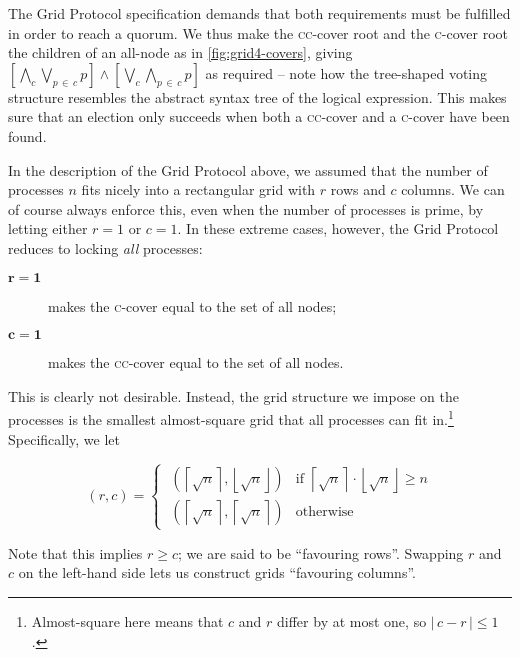 \documentclass[draft,11pt,chapterprefix=true,toc=bibliography,numbers=noendperiod,
               footnotes=multiple,twoside]{scrreprt}
\begin{document}
The Grid Protocol specification demands that both requirements must be fulfilled in order to reach a quorum. We thus make the \textsc{cc}-cover root and the \textsc{c}-cover root the children of an all-node as in \autoref{fig:grid4-covers}, giving \( \left[ \bigwedge_c \bigvee_{p\,\in\,c} p \right] \wedge \left[ \bigvee_c \bigwedge_{p\,\in\,c} p \right] \) as required -- note how the tree-shaped voting structure resembles the abstract syntax tree of the logical expression. This makes sure that an election only succeeds when both a \textsc{cc}-cover and a \textsc{c}-cover have been found.


In the description of the Grid Protocol above, we assumed that the number of processes \(n\) fits nicely into a rectangular grid with \(r\) rows and \(c\) columns. We can of course always enforce this, even when the number of processes is prime, by letting either \(r = 1\) or \(c = 1\). In these extreme cases, however, the Grid Protocol reduces to locking \emph{all} processes:

\begin{description}
    \item[\(\mathbf{r = 1}\)] makes the \textsc{c}-cover equal to the set of all nodes;
    \item[\(\mathbf{c = 1}\)] makes the \textsc{cc}-cover equal to the set of all nodes.
\end{description}

This is clearly not desirable. Instead, the grid structure we impose on the processes is the smallest almost-square grid that all processes can fit in.\footnote{Almost-square here means that \(c\) and \(r\) differ by at most one, so \(|\,c - r\,| \leq 1\).} Specifically, we let

\[ (r, c) =
    \begin{cases}
        \;\left( \left\lceil \sqrt{n} \right\rceil,
                 \left\lfloor \sqrt{n} \right\rfloor \right)
                 & \text{if } \left\lceil \sqrt{n} \right\rceil
                        \cdot \left\lfloor \sqrt{n} \right\rfloor \geq n \\[0.5em]
        \;\left( \left\lceil \sqrt{n} \right\rceil,
                 \left\lceil \sqrt{n} \right\rceil \right) & \text{otherwise}
    \end{cases}
\]

Note that this implies \(r \geq c\); we are said to be \enquote{favouring rows}. Swapping \(r\) and \(c\) on the left-hand side lets us construct grids \enquote{favouring columns}.
\end{document}
